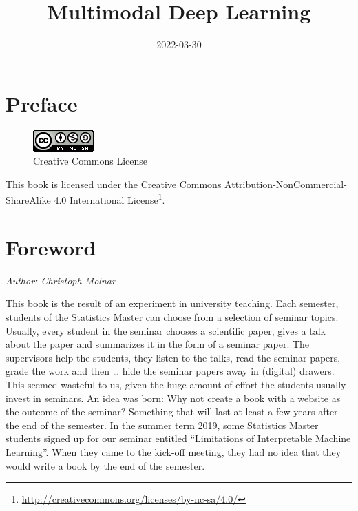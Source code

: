 \documentclass[
]{krantz}
\title{Multimodal Deep Learning}
\author{}
\date{\vspace{-2.5em}2022-03-30}
\renewcommand{\href}[2]{#2\footnote{\url{#1}}}
\begin{document}
\maketitle


\thispagestyle{empty}

\begin{center}
\end{center}

\setlength{\abovedisplayskip}{-5pt}
\setlength{\abovedisplayshortskip}{-5pt}

{
\hypersetup{linkcolor=}
\setcounter{tocdepth}{0}
\tableofcontents
}
\hypertarget{preface}{%
\chapter*{Preface}\label{preface}}


\begin{figure}
\centering
\includegraphics{figures/by-nc-sa.png}
\caption{Creative Commons License}
\end{figure}

This book is licensed under the \href{http://creativecommons.org/licenses/by-nc-sa/4.0/}{Creative Commons Attribution-NonCommercial-ShareAlike 4.0 International License}.

\mainmatter

\hypertarget{foreword}{%
\chapter*{Foreword}\label{foreword}}


\emph{Author: Christoph Molnar}

This book is the result of an experiment in university teaching.
Each semester, students of the Statistics Master can choose from a selection of seminar topics.
Usually, every student in the seminar chooses a scientific paper, gives a talk about the paper and summarizes it in the form of a seminar paper.
The supervisors help the students, they listen to the talks, read the seminar papers, grade the work and then \ldots{} hide the seminar papers away in (digital) drawers.
This seemed wasteful to us, given the huge amount of effort the students usually invest in seminars.
An idea was born:
Why not create a book with a website as the outcome of the seminar?
Something that will last at least a few years after the end of the semester.
In the summer term 2019, some Statistics Master students signed up for our seminar entitled ``Limitations of Interpretable Machine Learning''.
When they came to the kick-off meeting, they had no idea that they would write a book by the end of the semester.
\end{document}
